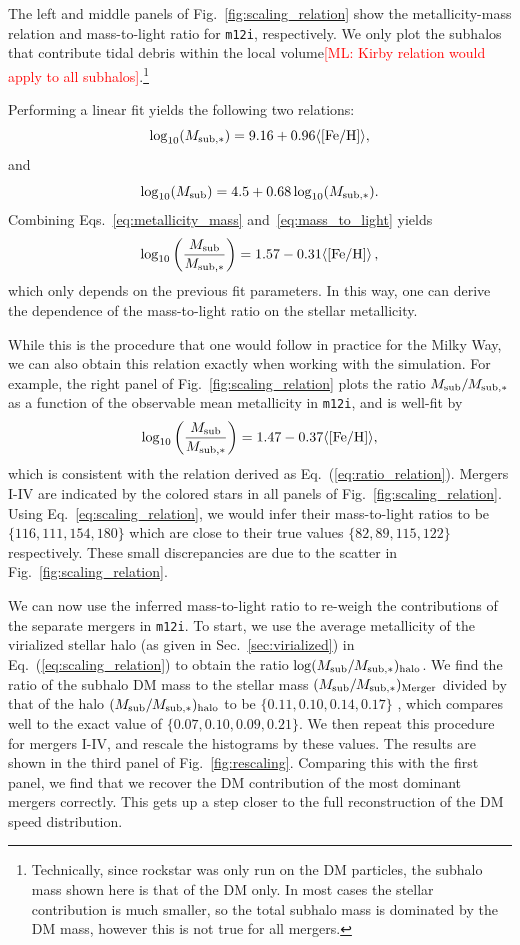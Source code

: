 \documentclass[twocolumn,preprintnumbers]{aastex6}
\newcommand {\be} {\begin {equation}}
\newcommand {\ee} {\end {equation}}
\DeclareRobustCommand{\Sec}[1]{Sec.~\ref{#1}}
\DeclareRobustCommand{\Fig}[1]{Fig.~\ref{#1}}
\DeclareRobustCommand{\Eq}[1]{Eq.~(\ref{#1})}
\def\ML#1{\textcolor{red}{[ML: #1]}}
\newcommand{\mi}{\texttt{m12i}}
\begin{document}
The left and middle panels of \Fig{fig:scaling_relation} show the metallicity-mass relation and mass-to-light ratio for \mi, respectively.  We only plot the subhalos that contribute tidal debris within the local volume\ML{Kirby relation would apply to all subhalos}.\footnote{Technically, since rockstar was only run on the DM particles, the subhalo mass shown here is that of the DM only. In most cases the stellar contribution is much smaller, so the total subhalo mass is dominated by the DM mass, however this is not true for all mergers.} 

Performing a linear fit yields the following two relations:
\be \label{eq:metallicity_mass}
\log_{10}(M_{\rm{sub}, *}) = 9.16 + 0.96 \langle \rm{[Fe/H]} \rangle,
\ee 
and 
\be \label{eq:mass_to_light}
\log_{10}(M_{\rm{sub}}) = 4.5 + 0.68 \log_{10}(M_{\rm{sub}, *}) .
\ee
Combining Eqs.~\ref{eq:metallicity_mass} and~\ref{eq:mass_to_light} yields
\be \label{eq:ratio_relation}
\log_{10} \left(\frac{M_{\rm{sub}}}{M_{\rm{sub}, *}} \right) =1.57-0.31 \langle \rm{[Fe/H]} \rangle \, ,
\ee
which only depends on the previous fit parameters.  In this way, one can derive the dependence of the mass-to-light ratio on the stellar metallicity.  

While this is the procedure that one would follow in practice for the Milky Way, we can also obtain this relation exactly when working with the simulation.  For example, the right panel of \Fig{fig:scaling_relation} plots the ratio $M_{\rm{sub}}/M_{\rm{sub}, *}$ as a function of the observable mean metallicity in \mi, and is well-fit by 
\be \label{eq:scaling_relation}
\log_{10} \left( \frac{M_{\rm{sub}}}{M_{\rm{sub}, *}} \right) = 1.47 - 0.37 \langle \rm{ [Fe/H] } \rangle,
\ee
which is consistent with the relation derived as \Eq{eq:ratio_relation}.
Mergers I-IV are indicated by the colored stars in all panels of \Fig{fig:scaling_relation}.  Using Eq.~\ref{eq:scaling_relation}, we would infer their mass-to-light ratios to be $\{ 116, 111, 154, 180 \}$ which are close to their true values $\{82, 89, 115, 122\}$ respectively. These small discrepancies are due to the scatter in \Fig{fig:scaling_relation}.

We can now use the inferred mass-to-light ratio to re-weigh the contributions of the separate mergers in \mi.  To start, we use the average metallicity of the virialized stellar halo (as given in  \Sec{sec:virialized}) in \Eq{eq:scaling_relation} to obtain the ratio $\log(M_{\rm{sub}}/M_{\rm{sub}, *})_{\rm{halo}}$.  We find the ratio of the subhalo DM mass to the stellar mass $(M_{\rm{sub}}/M_{\rm{sub}, *})_{\rm{Merger}}$  divided by that of the halo $(M_{\rm{sub}}/M_{\rm{sub}, *})_{\rm{halo}}$ to be $\{0.11, 0.10, 0.14, 0.17 \}$ , which compares well to the exact value of $\{0.07, 0.10, 0.09, 0.21\}$.  We then repeat this procedure for mergers I-IV, and rescale the histograms by these values.  The results are shown in the third panel of \Fig{fig:rescaling}.  Comparing this with the first panel, we find that we recover the DM contribution of the most dominant mergers correctly. This gets up a step closer to the full reconstruction of the DM speed distribution.   
\end{document}
